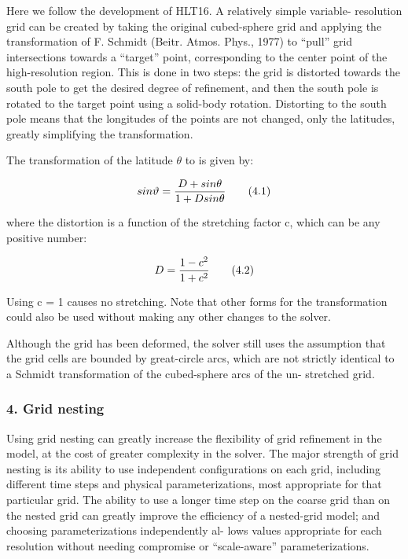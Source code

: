Here we follow the development of H\-L\-T16. A relatively simple variable-\/ resolution grid can be created by taking the original cubed-\/sphere grid and applying the transformation of F. Schmidt (Beitr. Atmos. Phys., 1977) to “pull” grid intersections towards a “target” point, corresponding to the center point of the high-\/resolution region. This is done in two steps\-: the grid is distorted towards the south pole to get the desired degree of refinement, and then the south pole is rotated to the target point using a solid-\/body rotation. Distorting to the south pole means that the longitudes of the points are not changed, only the latitudes, greatly simplifying the transformation.

The transformation of the latitude {$\theta$} to  is given by\-:

\[ sin\vartheta = \frac{D + sin\theta}{1 + Dsin\theta} \\ \tag {4.1} \]

where the distortion is a function of the stretching factor c, which can be any positive number\-:

\[ D = \frac{1 - c^2}{1 + c^2} \\ \tag {4.2} \]

Using c = 1 causes no stretching. Note that other forms for the transformation could also be used without making any other changes to the solver.

Although the grid has been deformed, the solver still uses the assumption that the grid cells are bounded by great-\/circle arcs, which are not strictly identical to a Schmidt transformation of the cubed-\/sphere arcs of the un-\/ stretched grid.

\subsubsection*{4. Grid nesting}

Using grid nesting can greatly increase the flexibility of grid refinement in the model, at the cost of greater complexity in the solver. The major strength of grid nesting is its ability to use independent configurations on each grid, including different time steps and physical parameterizations, most appropriate for that particular grid. The ability to use a longer time step on the coarse grid than on the nested grid can greatly improve the efficiency of a nested-\/grid model; and choosing parameterizations independently al-\/ lows values appropriate for each resolution without needing compromise or “scale-\/aware” parameterizations.

